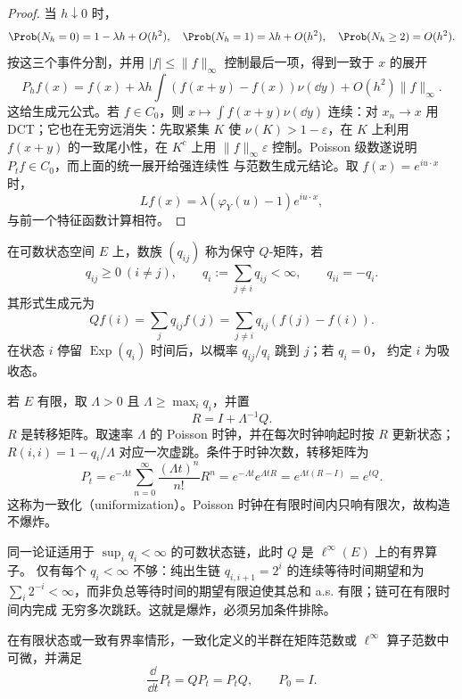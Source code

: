 \begin{proof}
当 $h\downarrow0$ 时，
\[
 \Prob(N_h=0)=1-\lambda h+O(h^2),\quad
 \Prob(N_h=1)=\lambda h+O(h^2),\quad
 \Prob(N_h\geq2)=O(h^2).
\]
按这三个事件分割，并用 $|f|\leq\|f\|_\infty$ 控制最后一项，得到一致于 $x$ 的展开
\[
 P_hf(x)=f(x)+\lambda h\int(f(x+y)-f(x))\nu(\dd y)+O(h^2)\|f\|_\infty.
\]
这给生成元公式。若 $f\in C_0$，则
$x\mapsto\int f(x+y)\nu(\dd y)$ 连续：对 $x_n\to x$ 用 DCT；它也在无穷远消失：先取紧集
$K$ 使 $\nu(K)>1-\varepsilon$，在 $K$ 上利用 $f(x+y)$ 的一致尾小性，在 $K^c$ 上用
$\|f\|_\infty\varepsilon$ 控制。Poisson 级数遂说明 $P_tf\in C_0$，而上面的统一展开给强连续性
与范数生成元结论。取 $f(x)=e^{iu\cdot x}$ 时，
\[
 Lf(x)=\lambda(\varphi_Y(u)-1)e^{iu\cdot x},
\]
与前一个特征函数计算相符。
\end{proof}

\begin{definition}[$Q$-矩阵]\label{def:6-3-3-3}
在可数状态空间 $E$ 上，数族 $(q_{ij})$ 称为保守 $Q$-矩阵，若
\[
 q_{ij}\geq0\ (i\ne j),\qquad
 q_i:=\sum_{j\ne i}q_{ij}<\infty,\qquad q_{ii}=-q_i.
\]
其形式生成元为
\[
 Qf(i)=\sum_jq_{ij}f(j)
 =\sum_{j\ne i}q_{ij}(f(j)-f(i)).
\]
在状态 $i$ 停留 $\operatorname{Exp}(q_i)$ 时间后，以概率 $q_{ij}/q_i$ 跳到 $j$；若 $q_i=0$，
约定 $i$ 为吸收态。
\end{definition}

\begin{example}[有限状态跳链]\label{ex:6-3-3-3}
若 $E$ 有限，取 $\Lambda>0$ 且 $\Lambda\geq\max_iq_i$，并置
\[
 R=I+\Lambda^{-1}Q.
\]
$R$ 是转移矩阵。取速率 $\Lambda$ 的 Poisson 时钟，并在每次时钟响起时按 $R$ 更新状态；
$R(i,i)=1-q_i/\Lambda$ 对应一次虚跳。条件于时钟次数，转移矩阵为
\[
 P_t=e^{-\Lambda t}\sum_{n=0}^\infty\frac{(\Lambda t)^n}{n!}R^n
 =e^{-\Lambda t}e^{\Lambda tR}
 =e^{\Lambda t(R-I)}=e^{tQ}.
\]
这称为一致化（uniformization）。Poisson 时钟在有限时间内只响有限次，故构造不爆炸。
\end{example}

同一论证适用于 $\sup_iq_i<\infty$ 的可数状态链，此时 $Q$ 是 $\ell^\infty(E)$ 上的有界算子。
仅有每个 $q_i<\infty$ 不够：纯出生链 $q_{i,i+1}=2^i$ 的连续等待时间期望和为
$\sum_i2^{-i}<\infty$，而非负总等待时间的期望有限迫使其总和 a.s. 有限；链可在有限时间内完成
无穷多次跳跃。这就是爆炸，必须另加条件排除。

\begin{proposition}\label{proposition:6-3-3-4}
在有限状态或一致有界率情形，一致化定义的半群在矩阵范数或
$\ell^\infty$ 算子范数中可微，并满足
\[
 \frac{\dd}{\dd t}P_t=QP_t=P_tQ,\qquad P_0=I.
\]
\end{proposition}

